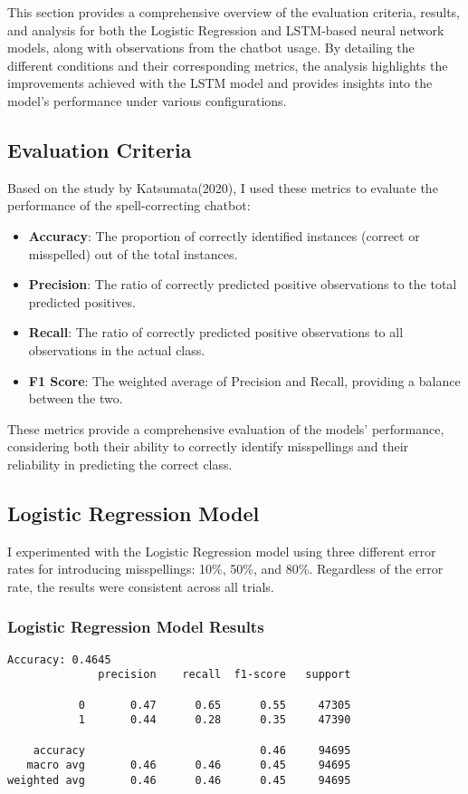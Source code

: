 This section provides a comprehensive overview of the evaluation criteria, results, and analysis for both the Logistic Regression and LSTM-based neural network models, along with observations from the chatbot usage. By detailing the different conditions and their corresponding metrics, the analysis highlights the improvements achieved with the LSTM model and provides insights into the model's performance under various configurations.

\subsection{Evaluation Criteria}
Based on the study by Katsumata(2020)\cite{Katsumata}, I used these metrics to evaluate the performance of the spell-correcting chatbot:
\begin{itemize}
    \item \textbf{Accuracy}: The proportion of correctly identified instances (correct or misspelled) out of the total instances.
    \item \textbf{Precision}: The ratio of correctly predicted positive observations to the total predicted positives.
    \item \textbf{Recall}: The ratio of correctly predicted positive observations to all observations in the actual class.
    \item \textbf{F1 Score}: The weighted average of Precision and Recall, providing a balance between the two.
\end{itemize}

These metrics provide a comprehensive evaluation of the models' performance, considering both their ability to correctly identify misspellings and their reliability in predicting the correct class.

\subsection{Logistic Regression Model}

I experimented with the Logistic Regression model using three different error rates for introducing misspellings: 10\%, 50\%, and 80\%. Regardless of the error rate, the results were consistent across all trials.

\subsubsection{Logistic Regression Model Results}

\begin{verbatim}
Accuracy: 0.4645
              precision    recall  f1-score   support

           0       0.47      0.65      0.55     47305
           1       0.44      0.28      0.35     47390

    accuracy                           0.46     94695
   macro avg       0.46      0.46      0.45     94695
weighted avg       0.46      0.46      0.45     94695
\end{verbatim}

